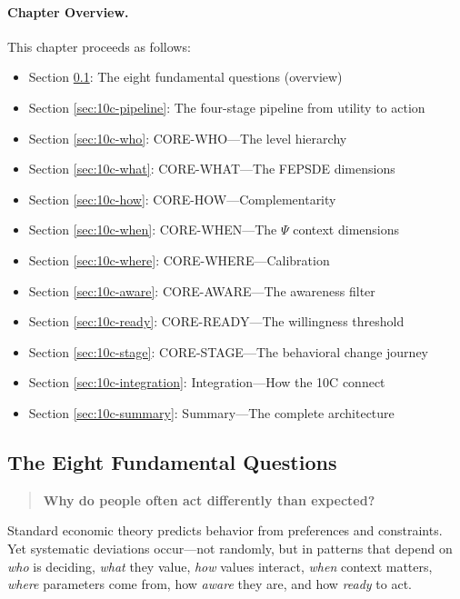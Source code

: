 \paragraph{Chapter Overview.}
\label{sec:10c-overview}
This chapter proceeds as follows:
\begin{itemize}
    \item Section \ref{sec:10c-questions}: The eight fundamental questions (overview)
    \item Section \ref{sec:10c-pipeline}: The four-stage pipeline from utility to action
    \item Section \ref{sec:10c-who}: CORE-WHO---The level hierarchy
    \item Section \ref{sec:10c-what}: CORE-WHAT---The FEPSDE dimensions
    \item Section \ref{sec:10c-how}: CORE-HOW---Complementarity
    \item Section \ref{sec:10c-when}: CORE-WHEN---The $\Psi$ context dimensions
    \item Section \ref{sec:10c-where}: CORE-WHERE---Calibration
    \item Section \ref{sec:10c-aware}: CORE-AWARE---The awareness filter
    \item Section \ref{sec:10c-ready}: CORE-READY---The willingness threshold
    \item Section \ref{sec:10c-stage}: CORE-STAGE---The behavioral change journey
    \item Section \ref{sec:10c-integration}: Integration---How the 10C connect
    \item Section \ref{sec:10c-summary}: Summary---The complete architecture
\end{itemize}

\subsection{The Eight Fundamental Questions}
\label{sec:10c-questions}

\begin{quote}
\textbf{Why do people often act differently than expected?}
\end{quote}

Standard economic theory predicts behavior from preferences and constraints.
Yet systematic deviations occur---not randomly, but in patterns that depend on
\emph{who} is deciding, \emph{what} they value, \emph{how} values interact,
\emph{when} context matters, \emph{where} parameters come from, how \emph{aware}
they are, and how \emph{ready} to act.

